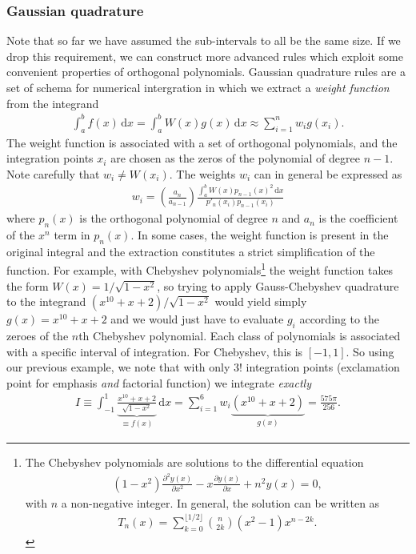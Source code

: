 \documentclass[a4paper]{article}
\newcommand{\dx}{\,\mathrm{d}x}
\newcommand{\pder}[2]{\frac{\partial   #1}{\partial   #2}}   %
\newcommand{\comment}[1]{\ignorespaces}
\begin{document}
\subsubsection{Gaussian quadrature}
Note that so far we have assumed the sub-intervals to all be the same size. If we drop this requirement, we can construct more advanced rules which exploit some convenient properties of orthogonal polynomials. Gaussian quadrature rules are a set of schema for numerical intergration in which we extract a \emph{weight function} from the integrand
\begin{align}
\int_a^bf(x)\dx = \int_a^b W(x)g(x)\dx \approx \sum_{i=1}^n w_ig(x_i).
\end{align}
The weight function is associated with a set of orthogonal polynomials, and the integration points $x_i$ are chosen as the zeros of the polynomial of degree $n-1$. Note carefully that $w_i\not=W(x_i)$. The weights $w_i$ can in general be expressed as \cite{krylov}
\begin{align}
w_i=\left(\frac{a_n}{a_{n-1}}\right)\frac{\int_a^b W(x) p_{n-1}(x)^2\dx}{p'_n(x_i)p_{n-1}(x_i)}
\end{align} 
where $p_n(x)$ is the orthogonal polynomial of degree $n$ and $a_n$ is the coefficient of the $x^n$ term in $p_n(x)$. In some cases, the weight function is present in the original integral and the extraction constitutes a strict simplification of the function. For example, with 
Chebyshev polynomials\footnote{The Chebyshev polynomials are solutions to the differential equation 
\begin{align}
(1-x^2)\pder{^2y(x)}{x^2}-x\pder{y(x)}{x} + n^2y(x)=0,
\end{align}
with $n$ a non-negative integer. In general, the solution can be written as \cite{rottmann}\comment{p95} \begin{align}
T_n(x)=\sum_{k=0}^{\lfloor 1/2 \rfloor}{n \choose 2k}(x^2-1)x^{n-2k}.
\end{align}} the weight function takes the form $W(x)=1/\sqrt{1-x^2}$, so trying to apply Gauss-Chebyshev quadrature to the integrand $(x^{10}+x+2)/\sqrt{1-x^2}$ would yield simply $g(x)=x^{10}+x+2$ and we would just have to evaluate $g_i$ according to the zeroes of the $n$th Chebyshev polynomial. Each class of polynomials is associated with a specific interval of integration. For Chebyshev, this is $[-1,1]$. So using our previous example, we note that with only $3!$ integration points (exclamation point for emphasis \emph{and} factorial function) we integrate \emph{exactly}
\begin{align}
I\equiv \int_{-1}^1 \underbrace{\frac{x^{10}+x+2}{\sqrt{1-x^2}}}_{\equiv f(x)}\dx = \sum_{i=1}^6w_i \underbrace{(x^{10}+x+2)}_{g(x)} = \frac{575\pi}{256}.
\end{align}
\end{document}
